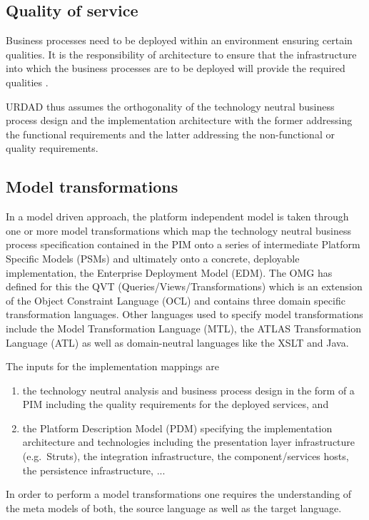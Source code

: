 \documentclass{IOS-Book-Article}
\begin{document}
\subsection{Quality of service}

Business processes need to be deployed within an environment ensuring certain qualities.
It is the responsibility of architecture to ensure that the infrastructure into which
the business processes are to be deployed will provide the required qualities
\cite{bass:softwareArchitecture}.

URDAD thus assumes the orthogonality of the technology neutral business process design and
the implementation architecture with the former addressing the functional requirements and
the latter addressing the non-functional or quality requirements.

\subsection{Model transformations}

In a model driven approach, the platform independent model is taken through one or
more model transformations which map the technology neutral business process specification
contained in the PIM onto a series of intermediate Platform Specific Models (PSMs)
and ultimately onto a concrete, deployable implementation, the Enterprise Deployment Model (EDM).
The OMG has defined for this the QVT (Queries/Views/Transformations) \cite{omg:qvt}
which is an extension of the Object Constraint Language (OCL) and contains three domain
specific transformation languages. Other languages used to specify model transformations include
the Model Transformation Language (MTL), the ATLAS Transformation Language (ATL) as well as domain-neutral
languages like the XSLT and Java.

The inputs for the implementation mappings are
\begin{enumerate}
  \item the technology neutral analysis and business process design in the form of a PIM including
			the quality requirements for the deployed services, and
  \item the Platform Description Model (PDM) specifying the implementation architecture
			and technologies including the presentation layer infrastructure (e.g.\ Struts),
			the integration infrastructure, the component/services hosts, the persistence
			infrastructure, ...
\end{enumerate}
In order to perform a model transformations one requires the understanding of the meta models of both,
the source language as well as the target language.
\end{document}
